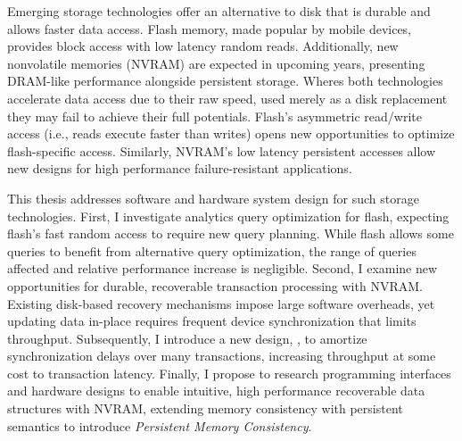 Emerging storage technologies offer an alternative to disk that is durable and allows faster data access.
Flash memory, made popular by mobile devices, provides block access with low latency random reads.
Additionally, new nonvolatile memories (NVRAM) are expected in upcoming years, presenting DRAM-like performance alongside persistent storage.
Wheres both technologies accelerate data access due to their raw speed, used merely as a disk replacement they may fail to achieve their full potentials.
Flash's asymmetric read/write access (i.e., reads execute faster than writes) opens new opportunities to optimize flash-specific access.
Similarly, NVRAM's low latency persistent accesses allow new designs for high performance failure-resistant applications.

This thesis addresses software and hardware system design for such storage technologies.
First, I investigate analytics query optimization for flash, expecting flash's fast random access to require new query planning.
While flash allows some queries to benefit from alternative query optimization, the range of queries affected and relative performance increase is negligible.
Second, I examine new opportunities for durable, recoverable transaction processing with NVRAM.
Existing disk-based recovery mechanisms impose large software overheads, yet updating data in-place requires frequent device synchronization that limits throughput.
Subsequently, I introduce a new design, \GroupCommit, to amortize synchronization delays over many transactions, increasing throughput at some cost to transaction latency.
Finally, I propose to research programming interfaces and hardware designs to enable intuitive, high performance recoverable data structures with NVRAM, extending memory consistency with persistent semantics to introduce \emph{Persistent Memory Consistency}.
